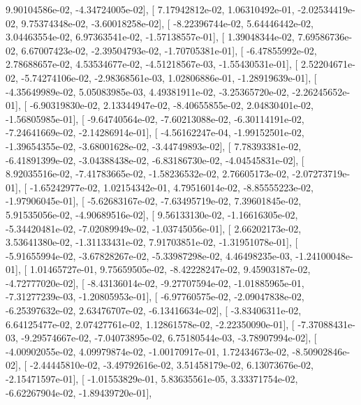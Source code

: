 \documentclass{article}
\begin{document}
          9.90104586e-02,  -4.34724005e-02],
       [  7.17942812e-02,   1.06310492e-01,  -2.02534419e-02,
          9.75374348e-02,  -3.60018258e-02],
       [ -8.22396744e-02,   5.64446442e-02,   3.04463554e-02,
          6.97363541e-02,  -1.57138557e-01],
       [  1.39048344e-02,   7.69586736e-02,   6.67007423e-02,
         -2.39504793e-02,  -1.70705381e-01],
       [ -6.47855992e-02,   2.78688657e-02,   4.53534677e-02,
         -4.51218567e-03,  -1.55430531e-01],
       [  2.52204671e-02,  -5.74274106e-02,  -2.98368561e-03,
          1.02806886e-01,  -1.28919639e-01],
       [ -4.35649989e-02,   5.05083985e-03,   4.49381911e-02,
         -3.25365720e-02,  -2.26245652e-01],
       [ -6.90319830e-02,   2.13344947e-02,  -8.40655855e-02,
          2.04830401e-02,  -1.56805985e-01],
       [ -9.64740564e-02,  -7.60213088e-02,  -6.30114191e-02,
         -7.24641669e-02,  -2.14286914e-01],
       [ -4.56162247e-04,  -1.99152501e-02,  -1.39654355e-02,
         -3.68001628e-02,  -3.44749893e-02],
       [  7.78393381e-02,  -6.41891399e-02,  -3.04388438e-02,
         -6.83186730e-02,  -4.04545831e-02],
       [  8.92035516e-02,  -7.41783665e-02,  -1.58236532e-02,
          2.76605173e-02,  -2.07273719e-01],
       [ -1.65242977e-02,   1.02154342e-01,   4.79516014e-02,
         -8.85555223e-02,  -1.97906045e-01],
       [ -5.62683167e-02,  -7.63495719e-02,   7.39601845e-02,
          5.91535056e-02,  -4.90689516e-02],
       [  9.56133130e-02,  -1.16616305e-02,  -5.34420481e-02,
         -7.02089949e-02,  -1.03745056e-01],
       [  2.66202173e-02,   3.53641380e-02,  -1.31133431e-02,
          7.91703851e-02,  -1.31951078e-01],
       [ -5.91655994e-02,  -3.67828267e-02,  -5.33987298e-02,
          4.46498235e-03,  -1.24100048e-01],
       [  1.01465727e-01,   9.75659505e-02,  -8.42228247e-02,
          9.45903187e-02,  -4.72777020e-02],
       [ -8.43136014e-02,  -9.27707594e-02,  -1.01885965e-01,
         -7.31277239e-03,  -1.20805953e-01],
       [ -6.97760575e-02,  -2.09047838e-02,  -6.25397632e-02,
          2.63476707e-02,  -6.13416634e-02],
       [ -3.83406311e-02,   6.64125477e-02,   2.07427761e-02,
          1.12861578e-02,  -2.22350090e-01],
       [ -7.37088431e-03,  -9.29574667e-02,  -7.04073895e-02,
          6.75180544e-03,  -3.78907994e-02],
       [ -4.00902055e-02,   4.09979874e-02,  -1.00170917e-01,
          1.72434673e-02,  -8.50902846e-02],
       [ -2.44445810e-02,  -3.49792616e-02,   3.51458179e-02,
          6.13073676e-02,  -2.15471597e-01],
       [ -1.01553829e-01,   5.83635561e-05,   3.33371754e-02,
         -6.62267904e-02,  -1.89439720e-01],
\end{document}
